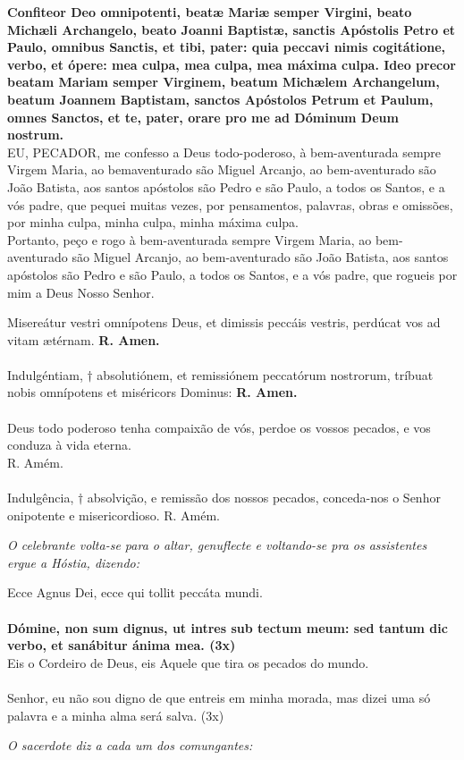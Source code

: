 \begin{multicols}{2}
	\noindent \textbf{Confiteor Deo omnipotenti, beatæ Mariæ semper Virgini, beato Michæli Archangelo, beato Joanni Baptistæ, sanctis Apóstolis Petro et Paulo, omnibus Sanctis, et tibi, pater: quia peccavi nimis cogitátione, verbo, et ópere: mea culpa, mea culpa, mea máxima culpa. Ideo precor beatam Mariam semper Virginem, beatum Michælem Archangelum, beatum Joannem Baptistam, sanctos Apóstolos Petrum et Paulum, omnes Sanctos, et te, pater, orare pro me ad Dóminum Deum nostrum.}
	\\ EU, PECADOR, me confesso a Deus todo-poderoso, à bem-aventurada sempre Virgem Maria, ao bemaventurado são Miguel Arcanjo, ao bem-aventurado são João Batista, aos santos apóstolos são Pedro e são Paulo, a todos os Santos, e a vós padre, que pequei muitas vezes, por pensamentos, palavras, obras e omissões, por minha culpa, minha culpa, minha máxima culpa. \\ Portanto, peço e rogo à bem-aventurada sempre Virgem Maria, ao bem-aventurado são Miguel Arcanjo, ao bem-aventurado são João Batista, aos santos apóstolos são Pedro e são Paulo, a todos os Santos, e a vós padre, que rogueis por mim a Deus Nosso Senhor. 
\end{multicols}
\begin{multicols}{2}
	\noindent Misereátur vestri omnípotens Deus, et dimissis peccáis vestris, perdúcat vos ad vitam ætérnam. \textbf{R. Amen.}
	\\
	\\Indulgéntiam, $\dag$ absolutiónem, et
	remissiónem peccatórum nostrorum,
	tríbuat nobis omnípotens et miséricors
	Dominus: \textbf{R. Amen.}
	\\
	\\Deus todo poderoso tenha compaixão de vós, perdoe os vossos pecados, e vos conduza à vida eterna.
	\\ R. Amém.
	\\
	\\Indulgência, $\dag$ absolvição, e remissão dos nossos pecados, conceda-nos o Senhor onipotente e misericordioso. R. Amém.
\end{multicols}
\begin{flushleft}
	\textit{
		O celebrante volta-se para o altar, genuflecte e voltando-se pra os assistentes ergue a Hóstia,
		dizendo:}
\end{flushleft}

\begin{multicols}{2}
	\noindent Ecce Agnus Dei, ecce qui tollit peccáta mundi.
	\\
	\\ \textbf{	Dómine, non sum dignus, ut intres sub tectum meum: sed tantum dic verbo, et sanábitur ánima mea. (3x)}
	\\ Eis o Cordeiro de Deus, eis Aquele que tira os pecados do mundo.
	\\
	\\ Senhor, eu não sou digno de que entreis em minha morada, mas dizei uma só palavra e a minha alma será salva. (3x)
\end{multicols}
\begin{flushleft}
	\textit{O sacerdote diz a cada um dos comungantes:}
\end{flushleft}

